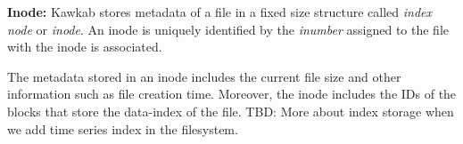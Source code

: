 \documentclass[]{article}
\newcommand{\subtopic}[1]{\vspace{1.5pt} \noindent \textbf{#1}}
\newcommand{\hl}[1]{\textcolor{notecolor}{#1}}
\begin{document}
\subtopic{Inode:} Kawkab stores metadata of a file in a fixed size structure
called \textit{index node} or \textit{inode}. An inode is uniquely identified by
the \textit{inumber} assigned to the file with the inode is associated.

The metadata stored in an inode includes the current file size and other
information such as file creation time. Moreover, the inode includes
the IDs of the blocks that store the data-index of the file.
\hl{TBD: More about index storage when we add time series index in the
filesystem.}


%
%
%
%
%
\end{document}
